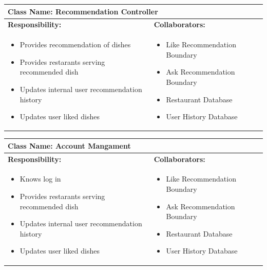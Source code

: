 \documentclass[]{article}
\begin{document}

\begin{table}[H]
	\centering
	\begin{tabular}{|p{7cm}|p{7cm}|}
	\hline 
	 \multicolumn{2}{|l|}{\textbf{Class Name:} Recommendation Controller} \\
	\hline
	\textbf{Responsibility:} & \textbf{Collaborators:} \\
	\hline
	\raggedright
	\begin{itemize}
		\item Provides recommendation of dishes
		\item  Provides restarants serving recommended dish
		\item Updates internal user recommendation history
		\item Updates user liked dishes
	\end{itemize}
	\vspace{1in} & 
	\begin{itemize}
		\item Like Recommendation Boundary
		\item Ask Recommendation Boundary
		\item Restaurant Database
		\item User History Database
	\end{itemize} \\
	\hline
	\end{tabular}
\end{table}

\begin{table}[H]
	\centering
	\begin{tabular}{|p{7cm}|p{7cm}|}
	\hline 
	 \multicolumn{2}{|l|}{\textbf{Class Name:} Account Mangament} \\
	\hline
	\textbf{Responsibility:} & \textbf{Collaborators:} \\
	\hline
	\raggedright
	\begin{itemize}
		\item Knows log in
		\item  Provides restarants serving recommended dish
		\item Updates internal user recommendation history
		\item Updates user liked dishes
	\end{itemize}
	\vspace{1in} & 
	\begin{itemize}
		\item Like Recommendation Boundary
		\item Ask Recommendation Boundary
		\item Restaurant Database
		\item User History Database
	\end{itemize} \\
	\hline
	\end{tabular}
\end{table}
\end{document}
